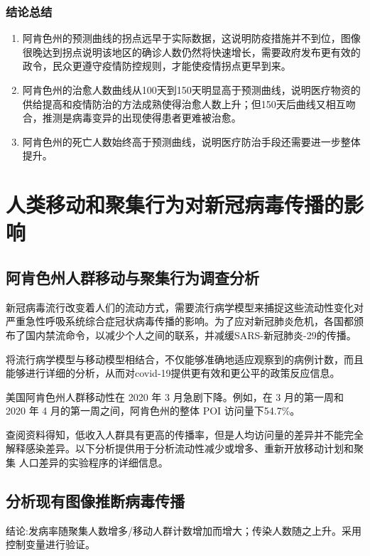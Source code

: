 \documentclass{cumcmthesis}
\begin{document}
\subsubsection{结论总结}
\begin{enumerate}
    \item 阿肯色州的预测曲线的拐点远早于实际数据，这说明防疫措施并不到位，图像很晚达到拐点说明该地区的确诊人数仍然将快速增长，需要政府发布更有效的政令，民众更遵守疫情防控规则，才能使疫情拐点更早到来。
    \item 阿肯色州的治愈人数曲线从100天到150天明显高于预测曲线，说明医疗物资的供给提高和疫情防治的方法成熟使得治愈人数上升；但150天后曲线又相互吻合，推测是病毒变异的出现使得患者更难被治愈。
    \item 阿肯色州的死亡人数始终高于预测曲线，说明医疗防治手段还需要进一步整体提升。
\end{enumerate}

\clearpage
\section{人类移动和聚集行为对新冠病毒传播的影响}
\subsection{阿肯色州人群移动与聚集行为调查分析}
新冠病毒流行改变着人们的流动方式，需要流行病学模型来捕捉这些流动性变化对严重急性呼吸系统综合症冠状病毒传播的影响。为了应对新冠肺炎危机，各国都颁布了国内禁流命令，以减少个人之间的联系，并减缓SARS-新冠肺炎-29的传播。

将流行病学模型与移动模型相结合，不仅能够准确地适应观察到的病例计数，而且能够进行详细的分析，从而对covid-19提供更有效和更公平的政策反应信息。

美国阿肯色州人群移动性在 2020 年 3 月急剧下降。例如，在 3 月的第一周和
2020 年 4 月的第一周之间，阿肯色州的整体 POI 访问量下54.7\%。

查阅资料得知，低收入人群具有更高的传播率，但是人均访问量的差异并不能完全解释感染差异。以下分析提供用于分析流动性减少或增多、重新开放移动计划和聚集
人口差异的实验程序的详细信息。

\subsection{分析现有图像推断病毒传播}
结论:发病率随聚集人数增多/移动人群计数增加而增大；传染人数随之上升。采用控制变量进行验证。
\end{document}

